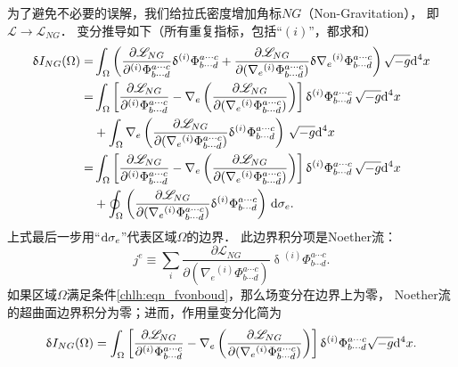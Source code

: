 为了避免不必要的误解，我们给拉氏密度增加角标$NG$（Non-Gravitation），
即$\mathscr{L}\to \mathscr{L}_{NG}$．
变分推导如下（所有重复指标，包括“$(i)$”，都求和）
\begin{align}
  \updelta I_{NG}(\Omega) =& \int_\Omega
  \left( \frac{\partial \mathscr{L}_{NG}}{\partial {}^{(i)}\Phi^{a\cdots c}_{b\cdots d}}
   \updelta {}^{(i)}\Phi^{a\cdots c}_{b\cdots d}
   + \frac{\partial \mathscr{L}_{NG}}{\partial (\nabla_e {}^{(i)}\Phi^{a\cdots c}_{b\cdots d})}
  \updelta \nabla_e {}^{(i)}\Phi^{a\cdots c}_{b\cdots d} \right) \sqrt{-g} {\rm d}^{4}x
    \notag \\
  =& \int_\Omega \left[ \frac{\partial \mathscr{L}_{NG}}{\partial {}^{(i)}\Phi^{a\cdots c}_{b\cdots d}}
   -  \nabla_e \left( \frac{\partial \mathscr{L}_{NG}}
   {\partial (\nabla_e{}^{(i)}\Phi^{a\cdots c}_{b\cdots d})} \right) \right]
    \updelta {}^{(i)}\Phi^{a\cdots c}_{b\cdots d} \, \sqrt{-g} {\rm d}^{4}x \notag \\
     &+ \int_{\Omega} \nabla_e
  \left( \frac{\partial \mathscr{L}_{NG}}{\partial(\nabla_e{}^{(i)}\Phi^{a\cdots c}_{b\cdots d})}
  \updelta {}^{(i)}\Phi^{a\cdots c}_{b\cdots d} \right)  \,\sqrt{-g} {\rm d}^{4}x  \notag \\
   =& \int_\Omega \left[ \frac{\partial \mathscr{L}_{NG}}{\partial {}^{(i)}\Phi^{a\cdots c}_{b\cdots d}}
   -  \nabla_e \left( \frac{\partial \mathscr{L}_{NG}}
   {\partial (\nabla_e{}^{(i)}\Phi^{a\cdots c}_{b\cdots d})} \right) \right]
   \updelta {}^{(i)}\Phi^{a\cdots c}_{b\cdots d} \, \sqrt{-g} {\rm d}^{4}x \notag \\
   &+ \oint_{\Omega} \left( \frac{\partial \mathscr{L}_{NG}}{\partial(\nabla_e
       {}^{(i)}\Phi^{a\cdots c}_{b\cdots d})}
   \updelta {}^{(i)}\Phi^{a\cdots c}_{b\cdots d} \right)  \,{\rm d}\sigma_e
    . \label{chlh:eqn_Delta-Action}
\end{align}
上式最后一步用“${\rm d}\sigma_e $”代表区域$\Omega$的边界．
此边界积分项是Noether流：
\begin{equation}\label{chlh:eqn_noether}
    j^e \equiv \sum_{i}\frac{\partial \mathscr{L}_{NG}}{\partial(\nabla_e
        {}^{(i)}\Phi^{a\cdots c}_{b\cdots d})}
    \updelta {}^{(i)}\Phi^{a\cdots c}_{b\cdots d}.
\end{equation}
如果区域$\Omega$满足条件\eqref{chlh:eqn_fvonboud}，那么场变分在边界上为零，
Noether流的超曲面边界积分为零；进而，作用量变分化简为
\begin{equation}\label{chlh:eqn_action_principle}
   \updelta I_{NG}(\Omega) = \int_\Omega \left[ \frac{\partial \mathscr{L}_{NG}}
        {\partial {}^{(i)}\Phi^{a\cdots c}_{b\cdots d}}
        -  \nabla_e \left( \frac{\partial \mathscr{L}_{NG}}
        {\partial (\nabla_e{}^{(i)}\Phi^{a\cdots c}_{b\cdots d})} \right) \right]
        \updelta {}^{(i)}\Phi^{a\cdots c}_{b\cdots d}  \sqrt{-g}{\rm d}^{4}x .
\end{equation}
